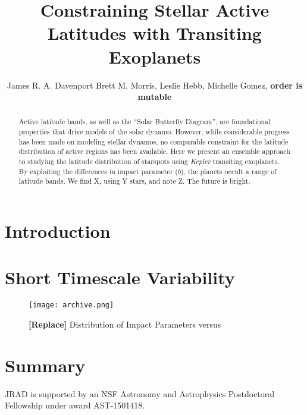 \documentclass[twocolumn]{aastex6}
\newcommand{\Kepler}{\textsl{Kepler}\xspace}
\begin{document}
\title{Constraining Stellar Active Latitudes with Transiting Exoplanets}


\author{
	James R. A. Davenport
	Brett M. Morris,
	Leslie Hebb, 
	Michelle Gomez,
	{\bf order is mutable}
	}




\begin{abstract}
Active latitude bands, as well as the ``Solar Butterfly Diagram'', are foundational properties that drive models of the solar dynamo. However, while considerable progress has been made on modeling stellar dynamos, no comparable constraint for the latitude distribution of active regions has been available. Here we present an ensemble approach to studying the latitude distribution of starspots using \Kepler transiting exoplanets. By exploiting the differences in impact parameter ($b$), the planets occult a range of latitude bands. We find X, using Y stars, and note Z. The future is bright.
\end{abstract}



\section{Introduction}
\label{sec:intro}

\cite{morris2017}

\cite{gomez2015}

\cite{davenport_phd}


\section{Short Timescale Variability}
\label{sec:short}


\begin{figure}[!t]
\centering
\texttt{[image: archive.png]}
\caption{{\bf [Replace]} Distribution of Impact Parameters versus }
\label{fig:medtime}
\end{figure}





\section{Summary}
\label{sec:summary}


\acknowledgments

JRAD is supported by an NSF Astronomy and Astrophysics Postdoctoral Fellowship under award AST-1501418. 



\end{document}
